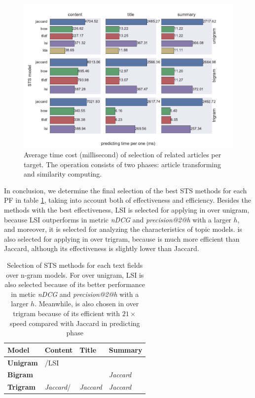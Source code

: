 \begin{figure}[!htb]
    \centering
    \includegraphics[width=\textwidth]{fig/predicting_time}
    \caption[Average time cost (millisecond) of selection of related articles per target]{Average time cost (millisecond) of selection of related articles per target. The operation consists of two phases: article transforming and similarity computing.}
    \label{fig:predict_time}
\end{figure}

In conclusion, we determine the final selection of the best STS methods for each PF in table \ref{tab:select}, taking into account both of effectiveness and efficiency. Besides the methods with the best effectiveness, LSI is selected for applying in \icontent{} over unigram, because LSI outperforms \tfidf{} in metric \textit{nDCG} and \textit{precision@2@h} with a larger $h$, and moreover, it is selected for analyzing the characteristics of topic models. \tfidf{} is also selected for applying in \icontent{} over trigram, because \tfidf{} is much more efficient than Jaccard, although its effectiveness is slightly lower than Jaccard. 

\begin{table}[!htb]
\centering
\small
\begin{tabularx}{0.8\textwidth}{|X|X|X|X|}
\hline
\textbf{Model} & \textbf{Content} & \textbf{Title} & \textbf{Summary} \\ \hline
\textbf{Unigram} & \tfidf{}/LSI & \tfidf{} & \tfidf{} \\ \hline
\textbf{Bigram} & \tfidf{} & \tfidf{} & \textit{Jaccard} \\ \hline
\textbf{Trigram} & \textit{Jaccard}/\tfidf{} & \textit{Jaccard} & \textit{Jaccard} \\ \hline
\end{tabularx}
\caption[Selection of STS methods for each text fields over n-gram models.]{Selection of STS methods for each text fields over n-gram models. For \icontent{} over unigram, LSI is also selected because of its better performance in metic \textit{nDCG} and \textit{precision@2@h} with a larger $h$. Meanwhile, \tfidf{} is also chosen in \icontent{} over trigram because of its efficient with $21 \times$ speed compared with Jaccard in predicting phase} 
\label{tab:select}
\end{table}


